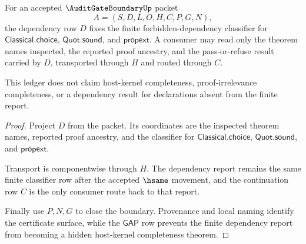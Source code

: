 \begin{theorem}
\label{thm:audit-gate-boundary-dependency-forbidden-set}
For an accepted $\AuditGateBoundaryUp$ packet
$$
A=(S,D,L,O,H,C,P,G,N),
$$
the dependency row $D$ fixes the finite forbidden-dependency classifier for $\mathsf{Classical.choice}$, $\mathsf{Quot.sound}$, and $\mathsf{propext}$. A consumer may read only the theorem names inspected, the reported proof ancestry, and the pass-or-refuse result carried by $D$, transported through $H$ and routed through $C$.

This ledger does not claim host-kernel completeness, proof-irrelevance completeness, or a dependency result for declarations absent from the finite report.
\end{theorem}
\begin{proof}
Project $D$ from the packet. Its coordinates are the inspected theorem names, reported proof ancestry, and the classifier for $\mathsf{Classical.choice}$, $\mathsf{Quot.sound}$, and $\mathsf{propext}$.

Transport is componentwise through $H$. The dependency report remains the same finite classifier row after the accepted $\hsame$ movement, and the continuation row $C$ is the only consumer route back to that report.

Finally use $P,N,G$ to close the boundary. Provenance and local naming identify the certificate surface, while the $\mathsf{GAP}$ row prevents the finite dependency report from becoming a hidden host-kernel completeness theorem.
\end{proof}

